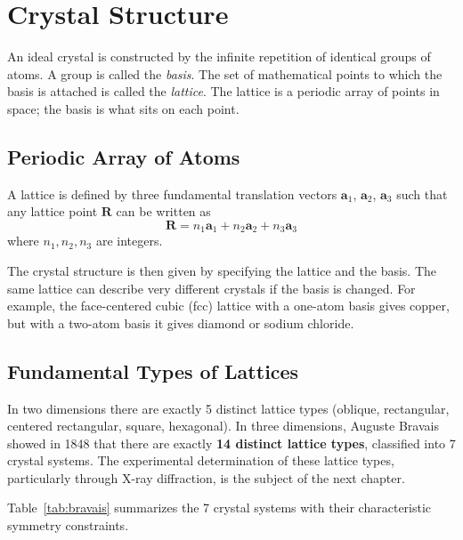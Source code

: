 \chapter{Crystal Structure}

An ideal crystal is constructed by the infinite repetition of identical groups of atoms. A group is called the \textit{basis}. The set of mathematical points to which the basis is attached is called the \textit{lattice}. The lattice is a periodic array of points in space; the basis is what sits on each point.

\section{Periodic Array of Atoms}

A lattice is defined by three fundamental translation vectors $\mathbf{a}_1$, $\mathbf{a}_2$, $\mathbf{a}_3$ such that any lattice point $\mathbf{R}$ can be written as
\begin{equation}
  \mathbf{R} = n_1 \mathbf{a}_1 + n_2 \mathbf{a}_2 + n_3 \mathbf{a}_3
\end{equation}
where $n_1, n_2, n_3$ are integers.

The crystal structure is then given by specifying the lattice and the basis. The same lattice can describe very different crystals if the basis is changed. For example, the face-centered cubic (fcc) lattice with a one-atom basis gives copper, but with a two-atom basis it gives diamond or sodium chloride.

\section{Fundamental Types of Lattices}

In two dimensions there are exactly 5 distinct lattice types (oblique, rectangular, centered rectangular, square, hexagonal). In three dimensions, Auguste Bravais showed in 1848 that there are exactly \textbf{14 distinct lattice types}, classified into 7 crystal systems. The experimental determination of these lattice types, particularly through X-ray diffraction, is the subject of the next chapter.

Table~\ref{tab:bravais} summarizes the 7 crystal systems with their characteristic symmetry constraints.

